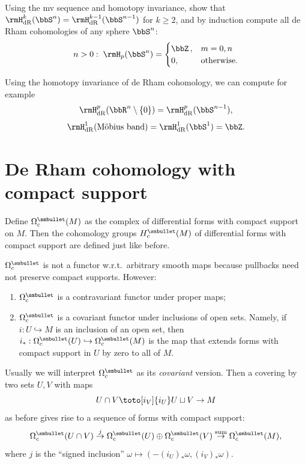 \begin{xca}
    Using the \gls{mv} sequence and homotopy invariance, show that $\rmH_{\rm dR}^k(\bbS^n)=\rmH_{\rm dR}^{k-1}(\bbS^{n-1})$ for $k\geq 2$, and by induction compute all de Rham cohomologies of any sphere $\bbS^n$:
    \[n>0:\; \rmH_p(\bbS^n)=\begin{cases} \bbZ\,, & m=0,n\\ 0, & \text{otherwise.}\end{cases}\]
\end{xca}


\begin{xca}
    Using the homotopy invariance of de Rham cohomology, we can compute for example
    \[\rmH^p_{\rm dR}(\bbR^n\setminus\{0\})=\rmH^p_{\rm dR}(\bbS^{n-1}),\]
    \[\rmH^1_{\rm dR}(\text{M\"obius band})=\rmH^1_{\rm dR}(\bbS^1)=\bbZ.\]
\end{xca}

\section{De Rham cohomology with compact support}

\begin{defn}
    Define $\Omega_c^{\smbullet }(M)$ as the complex of differential forms with compact support on $M$. Then the cohomology groups $H_c^{\smbullet }(M)$ of differential forms with compact support are defined just like before.
\end{defn}

\begin{prop}
    $\Omega_c^{\smbullet }$ is not a functor w.r.t.\ arbitrary smooth maps because pullbacks need not preserve compact supports. However:
    \begin{enumerate}
        \item $\Omega_c^{\smbullet }$ is a contravariant functor under proper maps;
        \item $\Omega_c^{\smbullet }$ is a covariant functor under inclusions of open sets. Namely, if $i:U\hookrightarrow M$ is an inclusion of an open set, then $i_\ast:\Omega_c^{\smbullet }(U)\hookrightarrow\Omega_c^{\smbullet }(M)$ is the map that extends forms with compact support in $U$ by zero to all of $M$.
    \end{enumerate}
\end{prop}
Usually we will interpret $\Omega_c^{\smbullet }$ as its \emph{covariant} version. Then a covering by two sets $U,V$ with maps 
\[U\cap V\toto[i_V]{i_U}U\sqcup V\to M \]
as before gives rise to a sequence of forms with compact support:
\[\Omega_c^{\smbullet }(U\cap V)\overset{j}{\to} \Omega_c^{\smbullet }(U)\oplus\Omega_c^{\smbullet }(V)\overset{\text{sum}}\to \Omega_c^{\smbullet} (M) ,\]
where $j$ is the ``signed inclusion'' $\omega\mapsto \left(-(i_U)_\ast \omega,(i_V)_\ast\omega\right)$.

